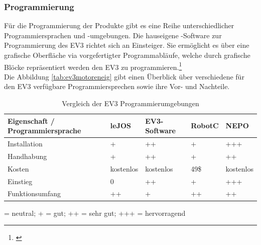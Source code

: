 \subsubsection{Programmierung}
Für die Programmierung der \LM{} Produkte gibt es eine Reihe unterschiedlicher Programmiersprachen und -umgebungen. Die hauseigene \LE{}-Software zur Programmierung des EV3 richtet sich an Einsteiger. Sie ermöglicht es über eine grafische Oberfläche via vorgefertigter Programmabläufe, welche durch grafische Blöcke repräsentiert werden den EV3 zu programmieren.\footnote{\citep[vgl.][EV3-Programmieren mit Java, Seite 25 f.]{Schobel.RobertaEV3Programmieren}\label{note33}} \\
Die Abbildung \eqref{tab:ev3motoreneig} gibt einen Überblick über verschiedene für den EV3 verfügbare Programmiersprechen sowie ihre Vor- und Nachteile.
\begin{table}[ht]
	\begin{tabular}{|p{}|p{}|p{}|p{}|p{}|} \hline
		Eigenschaft / Programmiersprache  & leJOS      & EV3-Software  & RobotC  & NEPO       \\ \hline
		Installation                      & +          & ++            & +       & +++        \\ \hline
		Handhabung    		           	  & +          & ++            & +       & ++         \\ \hline
		Kosten                            & kostenlos  & kostenlos     & 49\$    & kostenlos  \\ \hline
		Einstieg 	                      & 0          & ++            & +       & +++        \\ \hline  
		Funktionsumfang    				  & ++         & +             & ++      & ++         \\ \hline
	\end{tabular}
	\centering
	 = neutral; + = gut; ++ = sehr gut; +++ = hervorragend
	\caption[Vergleich der EV3 Programmierumgebungen]{Vergleich der EV3 Programmierumgebungen}
	\cite{Scholz.DasEV3}
	\label{tab:ev3motoreneig}
\end{table}
\newpage
